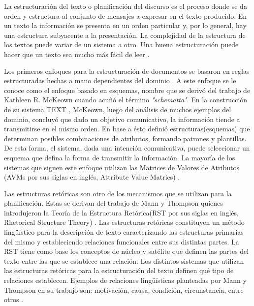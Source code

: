     La estructuración del texto o planificación del discurso es el proceso donde se da orden y estructura al conjunto de mensajes a expresar en el texto producido. En un texto la información se presenta en un orden particular 
y, por lo general, hay una estructura subyacente a la presentación. La complejidad de la estructura de los textos puede variar de un sistema a otro. Una buena estructuración puede hacer que un texto sea mucho más fácil 
de leer .

    Los primeros enfoques para la estructuración de documentos se basaron en reglas estructuradas hechas a mano dependientes del dominio . A este enfoque se le conoce como el enfoque basado en esquemas, nombre que 
se deriv\'o del trabajo de Kathleen R. McKeown  cuando acu\~n\'o el t\'ermino \textit{"schematta"}. En la construcci\'on de su sistema TEXT , McKeown, luego del análisis de muchos 
ejemplos del dominio, concluyó que dado un objetivo comunicativo, la información tiende a transmitirse en el mismo orden. En base a ésto defini\'o estructuras(esquemas) que determinan posibles combinaciones de atributos, formando patrones 
y plantillas. De esta forma, el sistema, dada una intenci\'on comunicativa, puede seleccionar un esquema que defina la forma de transmitir la información. La mayor\'ia de los sistemas que siguen este enfoque utilizan 
las Matrices de Valores de Atributos (AVMs por sus siglas en inglés, Attribute Value Matrics) .

    Las estructuras ret\'oricas son otro de los mecanismos que se utilizan para la planificación. Estas se derivan del trabajo de Mann y Thompson quienes introdujeron la Teor\'ia de la Estructura Ret\'orica(RST por
sus siglas en inglés, Rhetorical Structure Theory) . Las estructuras ret\'oricas constituyen un m\'etodo lingüístico para la descripci\'on de texto caracterizando las estructuras primarias del mismo y estableciendo 
relaciones funcionales entre sus distintas partes. La RST tiene como base los conceptos de n\'ucleo y sat\'elite que definen las partes del texto entre las que se establece una relaci\'on. Los distintos sistemas que utilizan las estructuras ret\'oricas 
para la estructuraci\'on del texto definen qué tipo de relaciones establecen. Ejemplos de relaciones lingüísticas planteadas por Mann y Thompson en su trabajo son: motivaci\'on, causa, condici\'on, circunstancia, entre otros . 

